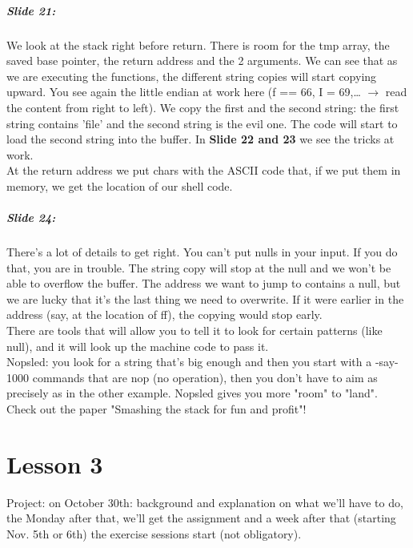 \documentclass[10pt,a4paper]{report}
\begin{document}
\paragraph{Slide 21:} We look at the stack right before return. There is room for the tmp array, the saved base pointer, the return address and the 2 arguments. We can see that as we are executing the functions, the different string copies will start copying upward. You see again the little endian at work here (f == 66, I = 69,… $\rightarrow$ read the content from right to left). 
We copy the first and the second string: the first string contains 'file' and the second string is the evil one. The code will start to load the second string into the buffer. In \textbf{Slide 22 and 23} we see the tricks at work. \\
At the return address we put chars with the ASCII code that, if we put them in memory, we get the location of our shell code. 

\paragraph{Slide 24:} There's a lot of details to get right. You can't put nulls in your input. If you do that, you are in trouble. The string copy will stop at the null and we won't be able to overflow the buffer. The address we want to jump to contains a null, but we are lucky that it's the last thing we need to overwrite. If it were earlier in the address (say, at the location of ff), the copying would stop early.\\
There are tools that will allow you to tell it to look for certain patterns (like null), and it will look up the machine code to pass it.\\
Nopsled: you look for a string that's big enough and then you start with a -say- 1000 commands that are nop (no operation), then you don't have to aim as precisely as in the other example. Nopsled gives you more "room" to "land". \\
Check out the paper "Smashing the stack for fun and profit"!

\chapter{Lesson 3}

Project: on October 30th: background and explanation on what we'll have to do, the Monday after that, we'll get the assignment and a week after that (starting Nov. 5th or 6th) the exercise sessions start (not obligatory).
\end{document}

